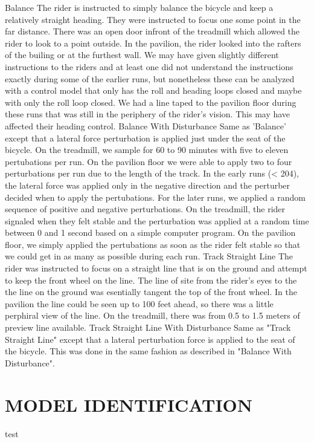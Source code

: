 \documentclass[twocolumn,10pt]{asme2e}
\begin{document}
Balance
   The rider is instructed to simply balance the bicycle and keep a relatively
   straight heading. They were instructed to focus one some point in the far
   distance. There was an open door infront of the treadmill which allowed the
   rider to look to a point outside. In the pavilion, the rider looked into the
   rafters of the builing or at the furthest wall. We may have given slightly
   different instructions to the riders and at least one did not understand the
   instructions exactly during some of the earlier runs, but nonetheless these
   can be analyzed with a control model that only has the roll and heading
   loops closed and maybe with only the roll loop closed. We had a line taped
   to the pavilion floor during these runs that was still in the periphery of
   the rider's vision. This may have affected their heading control.
Balance With Disturbance
   Same as 'Balance' except that a lateral force perturbation is applied just
   under the seat of the bicycle. On the treadmill, we sample for 60 to 90
   minutes with five to eleven pertubations per run. On the pavilion floor we
   were able to apply two to four perturbations per run due to the length of
   the track. In the early runs (< 204), the lateral force was applied only in
   the negative direction and the perturber decided when to apply the
   pertubations. For the later runs, we applied a random sequence of positive
   and negative perturbations. On the treadmill, the rider signaled when they
   felt stable and the perturbation was applied at a random time between 0 and
   1 second based on a simple computer program. On the pavilion floor, we
   simply applied the pertubations as soon as the rider felt stable so that we
   could get in as many as possible during each run.
Track Straight Line
   The rider was instructed to focus on a straight line that is on the ground
   and attempt to keep the front wheel on the line. The line of site from the
   rider's eyes to the the line on the ground was esentially tangent the top of
   the front wheel. In the pavilion the line could be seen up to 100 feet
   ahead, so there was a little perphiral view of the line. On the treadmill,
   there was from 0.5 to 1.5 meters of preview line available.
Track Straight Line With Disturbance
   Same as "Track Straight Line" except that a lateral perturbation force is
   applied to the seat of the bicycle. This was done in the same fashion as
   described in "Balance With Disturbance".

\section*{MODEL IDENTIFICATION}
test
\end{document}
